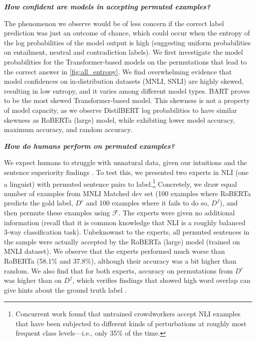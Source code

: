 \documentclass[12pt]{article}
\newcommand{\xit}[1]{{\noindent\textbf{\textit{#1}}}}
\begin{document}
\xit{How confident are models in accepting permuted examples?}

The phenomenon we observe would be of less concern if the correct label prediction was just an outcome of chance, which could occur when the entropy of the log probabilities of the model output is high (suggesting uniform probabilities on entailment, neutral and contradiction labels). We first investigate the model probabilities for the Transformer-based models on the permutations that lead to the correct answer in \autoref{fig:all_entropy}. We find overwhelming evidence that model confidences on in-distribution datasets (MNLI, SNLI) are highly skewed, resulting in low entropy, and it varies among different model types. BART proves to be the most skewed Transformer-based model. This skewness is not a property of model capacity, as we observe DistilBERT log probabilities to have similar skewness as RoBERTa (large) model, while exhibiting lower model accuracy, maximum accuracy, and random accuracy.

\xit{How do humans perform on permuted examples?}

We expect humans to struggle with unnatural data, given our intuitions and the sentence superiority findings \cite{mollica-2020-composition}. To test this, we presented two experts in NLI (one a linguist) with permuted sentence pairs to label.\footnote{Concurrent work \cite{gupta-etal-2021-bert} found that untrained crowdworkers accept NLI examples that have been subjected to different kinds of perturbations at roughly most frequent class levels---i.e., only 35\% of the time.} Concretely, we draw equal number of examples from MNLI Matched dev set (100 examples where RoBERTa predicts the gold label, $D^c$ and 100 examples where it fails to do so, $D^f$), and then permute these examples using $\mathcal{F}$. The experts were given no additional information (recall that it is common knowledge that NLI is a roughly balanced 3-way classification task). Unbeknownst to the experts, all permuted sentences in the sample were actually accepted by the RoBERTa (large) model (trained on MNLI dataset). We observe that the experts performed much worse than RoBERTa (58.1\% and 37.8\%), although their accuracy was a bit higher than random. We also find that for both experts, accuracy on permutations from $D^c$ was higher than on $D^f$, which verifies findings that showed high word overlap can give hints about the ground truth label \citep{dasgupta-etal-2018-evaluating, poliak-etal-2018-hypothesis, gururangan-etal-2018-annotation, naik-etal-2019-exploring}.
\end{document}
